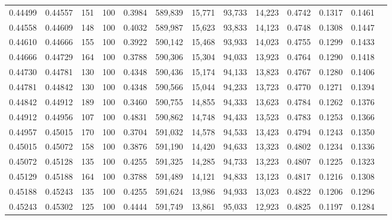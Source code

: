 \begin{tabular}{rrrrrrrrrrrrr}
0.44499 & 0.44557 &   151 & 100 &                                     0.3984 & 589,839 &  15,771 &  93,733 &  14,223 & 0.4742 & 0.1317 & 0.1461 \\
0.44558 & 0.44609 &   148 & 100 &                                     0.4032 & 589,987 &  15,623 &  93,833 &  14,123 & 0.4748 & 0.1308 & 0.1447 \\
0.44610 & 0.44666 &   155 & 100 &                                     0.3922 & 590,142 &  15,468 &  93,933 &  14,023 & 0.4755 & 0.1299 & 0.1433 \\
0.44666 & 0.44729 &   164 & 100 &                                     0.3788 & 590,306 &  15,304 &  94,033 &  13,923 & 0.4764 & 0.1290 & 0.1418 \\
0.44730 & 0.44781 &   130 & 100 &                                     0.4348 & 590,436 &  15,174 &  94,133 &  13,823 & 0.4767 & 0.1280 & 0.1406 \\
0.44781 & 0.44842 &   130 & 100 &                                     0.4348 & 590,566 &  15,044 &  94,233 &  13,723 & 0.4770 & 0.1271 & 0.1394 \\
0.44842 & 0.44912 &   189 & 100 &                                     0.3460 & 590,755 &  14,855 &  94,333 &  13,623 & 0.4784 & 0.1262 & 0.1376 \\
0.44912 & 0.44956 &   107 & 100 &                                     0.4831 & 590,862 &  14,748 &  94,433 &  13,523 & 0.4783 & 0.1253 & 0.1366 \\
0.44957 & 0.45015 &   170 & 100 &                                     0.3704 & 591,032 &  14,578 &  94,533 &  13,423 & 0.4794 & 0.1243 & 0.1350 \\
0.45015 & 0.45072 &   158 & 100 &                                     0.3876 & 591,190 &  14,420 &  94,633 &  13,323 & 0.4802 & 0.1234 & 0.1336 \\
0.45072 & 0.45128 &   135 & 100 &                                     0.4255 & 591,325 &  14,285 &  94,733 &  13,223 & 0.4807 & 0.1225 & 0.1323 \\
0.45129 & 0.45188 &   164 & 100 &                                     0.3788 & 591,489 &  14,121 &  94,833 &  13,123 & 0.4817 & 0.1216 & 0.1308 \\
0.45188 & 0.45243 &   135 & 100 &                                     0.4255 & 591,624 &  13,986 &  94,933 &  13,023 & 0.4822 & 0.1206 & 0.1296 \\
0.45243 & 0.45302 &   125 & 100 &                                     0.4444 & 591,749 &  13,861 &  95,033 &  12,923 & 0.4825 & 0.1197 & 0.1284 \\

\end{tabular}
